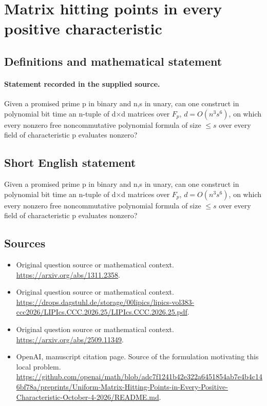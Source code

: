 \documentclass[11pt]{article}
\begin{document}
\section*{Matrix hitting points in every positive characteristic}\label{30007478}
\subsection{Definitions and mathematical statement}
\paragraph{Statement recorded in the supplied source.}
Given a promised prime p in binary and n,s in unary, can one construct in polynomial bit time an n-tuple of d×d matrices over $F_p$, $d=O(n^{3}s^{6})$, on which every nonzero free noncommutative polynomial formula of size $\leq s$ over every field of characteristic p evaluates nonzero?
\subsection{Short English statement}
Given a promised prime p in binary and n,s in unary, can one construct in polynomial bit time an n-tuple of d×d matrices over $F_p$, $d=O(n^{3}s^{6})$, on which every nonzero free noncommutative polynomial formula of size $\leq s$ over every field of characteristic p evaluates nonzero?
\subsection{Sources}
\begin{itemize}
\item[S1] Original question source or mathematical context.
\url{https://arxiv.org/abs/1311.2358}.
\item[S2] Original question source or mathematical context.
\url{https://drops.dagstuhl.de/storage/00lipics/lipics-vol383-ccc2026/LIPIcs.CCC.2026.25/LIPIcs.CCC.2026.25.pdf}.
\item[S3] Original question source or mathematical context.
\url{https://arxiv.org/abs/2509.11349}.
\item[S4] OpenAI, manuscript citation page. Source of the formulation motivating this local problem.
\url{https://github.com/openai/math/blob/adc7f1241b42e322a6451854ab7e4b4c146bf78a/preprints/Uniform-Matrix-Hitting-Points-in-Every-Positive-Characteristic-October-4-2026/README.md}.
\end{itemize}
\end{document}
